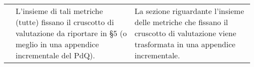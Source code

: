 {\begin{longtable}{ C{2.2cm} C{6cm} C{6cm}}
		\PdQ &  L’insieme di tali metriche (tutte) fissano il cruscotto di valutazione da riportare in §5 (o meglio in una appendice incrementale del PdQ). & La sezione riguardante l'insieme delle metriche che fissano il cruscotto di valutazione viene trasformata in una appendice incrementale.\\
		
	\end{longtable}
}


